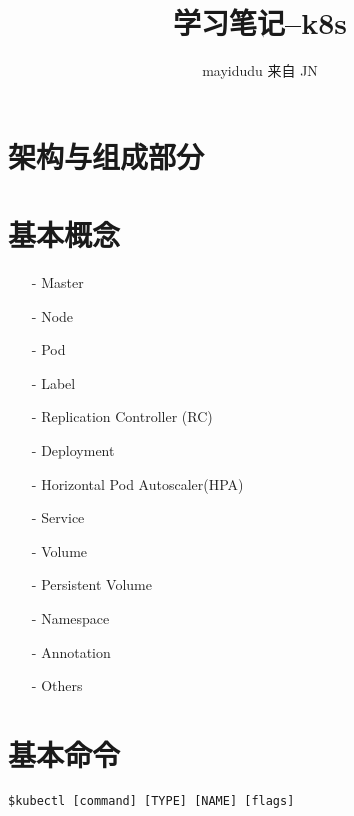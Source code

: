 \documentclass{ctexart}
\newcommand{\jn}{JN}
\begin{document}
\title{学习笔记--k8s}
\author{mayidudu 来自 \jn}
\maketitle
\tableofcontents


\section{架构与组成部分}

\section{基本概念}
\begin{enumerate}
	\item [-] Master
	
	\item [-] Node
	
	\item [-] Pod
	
	\item [-] Label
	
	\item [-] Replication Controller (RC)
	
	\item [-] Deployment
	
	\item [-] Horizontal Pod Autoscaler(HPA)
	
	\item [-] Service
	
	\item [-] Volume
	
	\item [-] Persistent Volume
	
	\item [-] Namespace
	
	\item [-] Annotation
	
	\item [-] Others
	
	
\end{enumerate}
\section{基本命令}
\lstset{language=C}
\begin{lstlisting}
$kubectl [command] [TYPE] [NAME] [flags]
\end{lstlisting}
\end{document}
